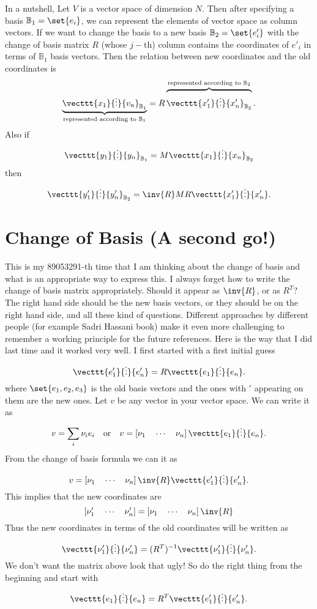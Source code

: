 \begin{summary}
	In a nutshell, Let $ V $ is a vector space of dimension $ N $. Then after specifying a basis $ \mathbb{B}_1 = \set{e_i} $, we can represent the elements of vector space as column vectors. If we want to change the basis to a new basis $ \mathbb{B}_2 = \set{e'_i} $ with the change of basis matrix $ R $ (whose $ j-\text{th} $) column contains the coordinates of $ e'_i $ in terms of $ \mathbb{B}_1 $ basis vectors. Then the relation between new coordinates and the old coordinates is 
	\[ \underbrace{\vecttt{x_1}{\vdots}{v_n}_{\mathbb{B}_1} }_\text{represented according to $ \mathbb{B}_1 $}= R \overbrace{\vecttt{x'_1}{\vdots}{x'_n}_{\mathbb{B}_2}}^{\text{represented according to $ \mathbb{B}_2 $}}. \]
	Also if 
	\[ \vecttt{y_1}{\vdots}{y_n}_{\mathbb{B}_1} = M \vecttt{x_1}{\vdots}{x_n}_{\mathbb{B}_2} \]
	then 
	\[ \vecttt{y'_1}{\vdots}{y'_n}_{\mathbb{B}_2} = \inv{R}M R \vecttt{x'_1}{\vdots}{x'_n}. \]
\end{summary}


\section{Change of Basis (A second go!)}
This is my 89053291-th time that I am thinking about the change of basis and what is an appropriate way to express this. I always forget how to write the change of basis matrix appropriately. Should it appear as $ \inv{R} $, or as $ R^T $? The right hand side should be the new basis vectors, or they should be on the right hand side, and all these kind of questions. Different approaches by different people  (for example Sadri Hassani book) make it even more challenging to remember a working principle for the future references. Here is the way that I did last time and it worked very well. I first started with a first initial guess
\[ \vecttt{e'_1}{\vdots}{e'_n} = R \vecttt{e_1}{\vdots}{e_n}. \]
where $ \set{e_1,e_2,e_3} $ is the old basis vectors and the ones with $ ' $ appearing on them are the new ones. Let $ v $ be any vector in your vector space. We can write it as
\[ v = \sum_i \nu_i e_i \quad \text{or} \quad v = \left[ \nu_1 \quad \cdots \quad \nu_n \right] \vecttt{e_1}{\vdots}{e_n}.  \]
From the change of basis formula we can it as
\[ v = \left[ \nu_1 \quad \cdots \quad \nu_n \right] \inv{R} \vecttt{e'_1}{\vdots}{e'_n}. \]
This implies that the new coordinates are
\[\left[ \nu'_1 \quad \cdots \quad \nu'_n \right] = \left[ \nu_1 \quad \cdots \quad \nu_n \right] \inv{R} \]
Thus the new coordinates in terms of the old coordinates will be written as
\[  \vecttt{\nu'_1}{\vdots}{\nu'_n} = (R^T)^{-1} \vecttt{\nu'_1}{\vdots}{\nu'_n}. \]
We don't want the matrix above look that ugly! So do the right thing from the beginning and start with
\[ \vecttt{e_1}{\vdots}{e_n} = R^T \vecttt{e'_1}{\vdots}{e'_n}. \]

